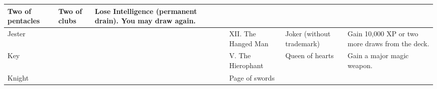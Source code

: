 \begin{longtable}{llllllll}
{\begin{minipage}[t]{0.460in}
Two of pentacles\end{minipage}} & \multicolumn{1}{p{0.872in}|}{\begin{minipage}[t]{0.872in}\raggedright
Two of clubs\end{minipage}} & \multicolumn{1}{p{1.000in}|}{\begin{minipage}[t]{1.000in}\raggedright
Lose Intelligence (permanent drain). You may draw again.\end{minipage}}\\
\hline
\multicolumn{5}{p{2.168in}|}{\begin{minipage}[t]{2.168in}\raggedright
Jester\end{minipage}} & \multicolumn{1}{|p{0.460in}|}{\begin{minipage}[t]{0.460in}\raggedright
XII. The Hanged Man\end{minipage}} & \multicolumn{1}{p{0.872in}|}{\begin{minipage}[t]{0.872in}\raggedright
Joker (without trademark)\end{minipage}} & \multicolumn{1}{p{1.000in}|}{\begin{minipage}[t]{1.000in}\raggedright
Gain 10,000 XP or two more draws from the deck.\end{minipage}}\\
\hline
\multicolumn{5}{p{2.168in}|}{\begin{minipage}[t]{2.168in}\raggedright
Key\end{minipage}} & \multicolumn{1}{|p{0.460in}|}{\begin{minipage}[t]{0.460in}\raggedright
V. The Hierophant\end{minipage}} & \multicolumn{1}{p{0.872in}|}{\begin{minipage}[t]{0.872in}\raggedright
Queen of hearts\end{minipage}} & \multicolumn{1}{p{1.000in}|}{\begin{minipage}[t]{1.000in}\raggedright
Gain a major magic weapon.\end{minipage}}\\
\hline
\multicolumn{5}{p{2.168in}|}{\begin{minipage}[t]{2.168in}\raggedright
Knight\end{minipage}} & \multicolumn{1}{|p{0.460in}|}{\begin{minipage}[t]{0.460in}\raggedright
Page of swords\end{minipage}} & \multicolumn{1}{p{0.872in}|}{\begin{minipage}[t]{0.872in}\raggedright

\end{minipage}}
\end{longtable}
